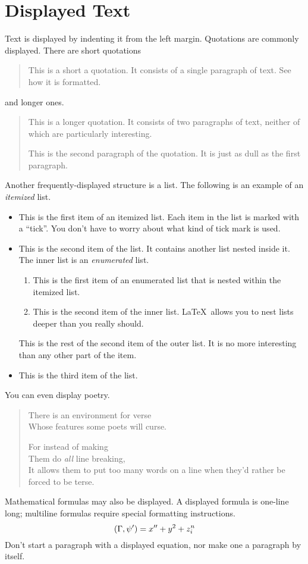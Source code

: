 \section{Displayed Text}

Text is displayed by indenting it from the left
margin.  Quotations are commonly displayed.  There
are short quotations
\begin{quote}
   This is a short a quotation.  It consists of a
   single paragraph of text.  See how it is formatted.
\end{quote}
and longer ones.
\begin{quotation}
   This is a longer quotation.	It consists of two
   paragraphs of text, neither of which are
   particularly interesting.

   This is the second paragraph of the quotation.  It
   is just as dull as the first paragraph.
\end{quotation}
Another frequently-displayed structure is a list.
The following is an example of an \emph{itemized}
list.
\begin{itemize}
   \item This is the first item of an itemized list.
	 Each item in the list is marked with a ``tick''.
	 You don't have to worry about what kind of tick
	 mark is used.

   \item This is the second item of the list.  It
	 contains another list nested inside it.  The inner
	 list is an \emph{enumerated} list.
	 \begin{enumerate}
	    \item This is the first item of an enumerated
		  list that is nested within the itemized list.

	    \item This is the second item of the inner list.
		  \LaTeX\ allows you to nest lists deeper than
		  you really should.
	 \end{enumerate}
	 This is the rest of the second item of the outer
	 list.	It is no more interesting than any other
	 part of the item.
   \item This is the third item of the list.
\end{itemize}
You can even display poetry.
\begin{verse}
   There is an environment
    for verse \\	     %
   Whose features some poets %
   will curse.


   For instead of making\\
   Them do \emph{all} line breaking, \\
   It allows them to put too many words on a line when they'd rather be
   forced to be terse.
\end{verse}

Mathematical formulas may also be displayed.  A
displayed formula
is
one-line long; multiline
formulas require special formatting instructions.
   \[  (\Gamma, \psi') = x'' + y^{2} + z_{i}^{n}\]
Don't start a paragraph with a displayed equation,
nor make one a paragraph by itself.


